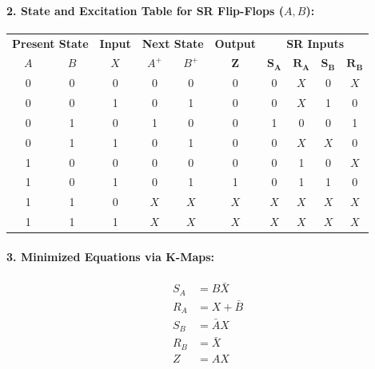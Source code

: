 \documentclass[11pt,a4paper,oneside]{book}
\begin{document}
\paragraph{2. State and Excitation Table for SR Flip-Flops ($A, B$):}
\begin{center}
\begin{tabular}{|cc|c|cc|c|cccc|}
\hline
\multicolumn{2}{|c|}{\textbf{Present State}} & \textbf{Input} & \multicolumn{2}{c|}{\textbf{Next State}} & \textbf{Output} & \multicolumn{4}{c|}{\textbf{SR Inputs}} \\
$A$ & $B$ & $X$ & $A^+$ & $B^+$ & $\mathbf{Z}$ & $\mathbf{S_A}$ & $\mathbf{R_A}$ & $\mathbf{S_B}$ & $\mathbf{R_B}$ \\ \hline
0 & 0 & 0 & 0 & 0 & 0 & 0 & $X$ & 0 & $X$ \\ \hline
0 & 0 & 1 & 0 & 1 & 0 & 0 & $X$ & 1 & 0 \\ \hline
0 & 1 & 0 & 1 & 0 & 0 & 1 & 0 & 0 & 1 \\ \hline
0 & 1 & 1 & 0 & 1 & 0 & 0 & $X$ & $X$ & 0 \\ \hline
1 & 0 & 0 & 0 & 0 & 0 & 0 & 1 & 0 & $X$ \\ \hline
1 & 0 & 1 & 0 & 1 & 1 & 0 & 1 & 1 & 0 \\ \hline
1 & 1 & 0 & $X$ & $X$ & $X$ & $X$ & $X$ & $X$ & $X$ \\ \hline
1 & 1 & 1 & $X$ & $X$ & $X$ & $X$ & $X$ & $X$ & $X$ \\ \hline
\end{tabular}
\end{center}

\paragraph{3. Minimized Equations via K-Maps:}
\begin{align*}
S_A &= B\bar{X} \\
R_A &= X + \bar{B} \\
S_B &= \bar{A}X \\
R_B &= \bar{X} \\
Z &= AX
\end{align*}
\end{document}

